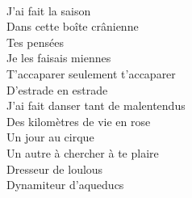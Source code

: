 \\
J'ai fait la saison \\
Dans cette boîte crânienne \\
Tes pensées \\
Je les faisais miennes \\
T'accaparer seulement t'accaparer \\
D'estrade en estrade \\
J'ai fait danser tant de malentendus \\
Des kilomètres de vie en rose \\
Un jour au cirque \\
Un autre à chercher à te plaire \\
Dresseur de loulous \\
Dynamiteur d'aqueducs \\
